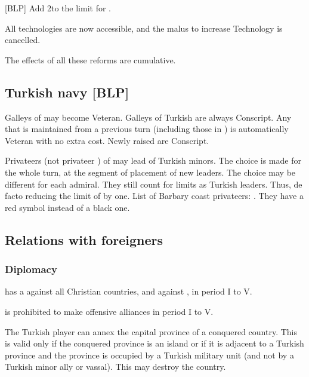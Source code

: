 [BLP] Add 2\LeaderG to the limit for \TUR.

All technologies are now accessible, and the malus to increase
Technology is cancelled.

\aparag The effects of all these reforms are cumulative.

\subsection{Turkish navy [BLP]}
\aparag Galleys of \TUR may become Veteran. Galleys of Turkish \VASSAL
are always Conscript.
\bparag Any \NGD that is maintained from a previous turn (including
those in \FLEET) is automatically Veteran with no extra cost.
\bparag Newly raised \NGD are Conscript.

 Privateers \LeaderA (not privateer
\LeaderE) of \TUR may lead \corsaire of Turkish minors.
\bparag The choice is made for the whole turn, at the segment of
placement of new leaders. The choice may be different for each
admiral.
\bparag They still count for limits as Turkish leaders. Thus, de facto
reducing the limit of \LeaderA by one.
\bparag List of Barbary coast privateers:
. They have a red symbol instead
of a black one.

\subsection{Relations with foreigners}
\subsubsection{Diplomacy}
\aparag \TUR has a \CB against all Christian countries, and against
, in period I to V.

\aparag \TUR is prohibited to make offensive alliances in period I to V.

 The Turkish player can annex the capital
province of a conquered country. This is valid only if the conquered
province is an island or if it is adjacent to a Turkish province
%
%
and the province is occupied by a Turkish military unit (and not by a
Turkish minor ally or vassal). This may destroy the country.

